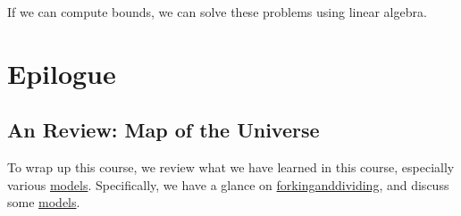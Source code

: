 \begin{remark}
	If we can compute bounds, we can solve these problems using linear algebra.
\end{remark}

\chapter{Epilogue}
\section{An Review: Map of the Universe}
To wrap up this course, we review what we have learned in this course, especially various \hyperref[def:model]{models}. Specifically, we have a glance on \href{www.forkinganddividing.com}{forkinganddividing}, and discuss some \hyperref[def:model]{models}.